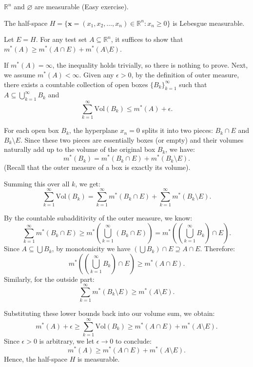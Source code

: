 \begin{example}
    $\mathbb{R}^n$ and $\varnothing$ are measurable (Easy exercise).
\end{example}

\begin{proposition}
    The half-space $H = \{\mathbf{x} = (x_1, x_2, \dots, x_n) \in \mathbb{R}^n : x_n \ge 0\}$ is Lebesgue measurable.
\end{proposition}

\begin{pfbox}
    Let $E = H$. For any test set $A \subseteq \mathbb{R}^n$, it suffices to show that $m^*(A) \ge m^*(A \cap E) + m^*(A \setminus E)$.
    
    If $m^*(A) = \infty$, the inequality holds trivially, so there is nothing to prove.
    Next, we assume $m^*(A) < \infty$. Given any $\epsilon > 0$, by the definition of outer measure, there exists a countable collection of open boxes $\{B_k\}_{k=1}^\infty$ such that $A \subseteq \bigcup_{k=1}^\infty B_k$ and
    $$ \sum_{k=1}^\infty \mathrm{Vol}(B_k) \le m^*(A) + \epsilon. $$
    
    For each open box $B_k$, the hyperplane $x_n = 0$ splits it into two pieces: $B_k \cap E$ and $B_k \setminus E$. Since these two pieces are essentially boxes (or empty) and their volumes naturally add up to the volume of the original box $B_k$, we have:
    $$ m^*(B_k) = m^*(B_k \cap E) + m^*(B_k \setminus E). $$
    (Recall that the outer measure of a box is exactly its volume).
    
    Summing this over all $k$, we get:
    $$ \sum_{k=1}^\infty \mathrm{Vol}(B_k) = \sum_{k=1}^\infty m^*(B_k \cap E) + \sum_{k=1}^\infty m^*(B_k \setminus E). $$
    
    By the countable subadditivity of the outer measure, we know:
    $$ \sum_{k=1}^\infty m^*(B_k \cap E) \ge m^*\left( \bigcup_{k=1}^\infty (B_k \cap E) \right) = m^*\left( \left(\bigcup_{k=1}^\infty B_k\right) \cap E \right). $$
    Since $A \subseteq \bigcup B_k$, by monotonicity we have $\left(\bigcup B_k\right) \cap E \supseteq A \cap E$. Therefore:
    $$ m^*\left( \left(\bigcup_{k=1}^\infty B_k\right) \cap E \right) \ge m^*(A \cap E). $$
    Similarly, for the outside part:
    $$ \sum_{k=1}^\infty m^*(B_k \setminus E) \ge m^*(A \setminus E). $$
    
    Substituting these lower bounds back into our volume sum, we obtain:
    $$ m^*(A) + \epsilon \ge \sum_{k=1}^\infty \mathrm{Vol}(B_k) \ge m^*(A \cap E) + m^*(A \setminus E). $$
    Since $\epsilon > 0$ is arbitrary, we let $\epsilon \to 0$ to conclude:
    $$ m^*(A) \ge m^*(A \cap E) + m^*(A \setminus E). $$
    Hence, the half-space $H$ is measurable.
\end{pfbox}

